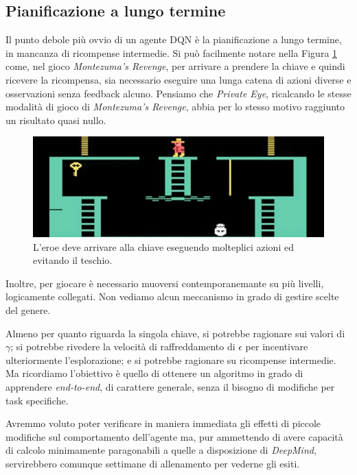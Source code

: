 \documentclass[twoside,twocolumn,10pt]{extarticle}
\theoremstyle{definition}
\begin{document}
	\subsection{Pianificazione a lungo termine}
		Il punto debole più ovvio di un agente DQN è la pianificazione a lungo termine, in mancanza di ricompense intermedie. Si può facilmente notare nella Figura \ref{fig:montezuma} come, nel gioco \textit{Montezuma's Revenge}, per arrivare a prendere la chiave e quindi ricevere la ricompensa, sia necessario eseguire una lunga catena di azioni diverse e osservazioni senza feedback alcuno. Pensiamo che \textit{Private Eye}, ricalcando le stesse modalità di gioco di \textit{Montezuma's Revenge}, abbia per lo stesso motivo raggiunto un risultato quasi nullo.
		\begin{figure}[ht!]
			\centering
			\includegraphics[scale=.31]{images/montezuma.jpg}
			\caption{L'eroe deve arrivare alla chiave eseguendo molteplici azioni ed evitando il teschio.}
			\label{fig:montezuma}
		\end{figure}
		Inoltre, per giocare è necessario muoversi contemporanemante su più livelli, logicamente collegati. Non vediamo alcun meccanismo in grado di gestire scelte del genere.
		
		Almeno per quanto riguarda la singola chiave, si potrebbe ragionare sui valori di $\gamma$; si potrebbe rivedere la velocità di raffreddamento di $\epsilon$ per incentivare ulteriormente l'esplorazione; e si potrebbe ragionare su ricompense intermedie. Ma ricordiamo l'obiettivo è quello di ottenere un algoritmo in grado di apprendere \textit{end-to-end}, di carattere generale, senza il bisogno di modifiche per task specifiche.
		
		Avremmo voluto poter verificare in maniera immediata gli effetti di piccole modifiche sul comportamento dell'agente ma, pur ammettendo di avere capacità di calcolo minimamente paragonabili a quelle a disposizione di \textit{DeepMind}, servirebbero comunque settimane di allenamento per vederne gli esiti.
\end{document}
